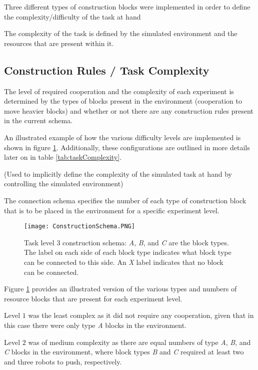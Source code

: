 Three different types of construction blocks were implemented in order to define the complexity/difficulty of the task at hand

The complexity of the task is defined by the simulated environment and the resources that are present within it.

\subsection{Construction Rules / Task Complexity}

The level of required cooperation and the complexity of each experiment is determined by the types of blocks present in the environment (cooperation to move heavier blocks) and whether or not there are any construction rules present in the current schema.

An illustrated example of how the various difficulty levels are implemented is shown in figure \ref{fig:constructionSchema}.
Additionally, these configurations are outlined in more details later on in table \ref{tab:taskComplexity}.

(Used to implicitly define the complexity of the simulated task at hand by controlling the simulated environment)

The connection schema specifies the number of each type of construction block that is to be placed in the environment for a specific experiment level. 

\begin{figure}[t]
	\centering
	\texttt{[image: ConstructionSchema.PNG]}
	\caption{Task level 3 construction schema: \textit{A}, \textit{B}, and \textit{C} are the block types.  The label on
each side of each block type indicates what block type can be connected to this side.  An \textit{X} label indicates
that no block can be connected.}\label{fig:constructionSchema}
\end{figure}

Figure \ref{fig:constructionSchema} provides an illustrated version of the various types and numbers of resource blocks that are present for each experiment level.

Level $1$ was the least complex as it did not require
any cooperation, given that in this case there were only type \textit{A}
blocks in the environment.

Level $2$ was of medium complexity as there are equal numbers of type \textit{A},
\textit{B}, and \textit{C} blocks in the environment, where block types \textit{B} and \textit{C} required
at least two and three robots to push, respectively.

